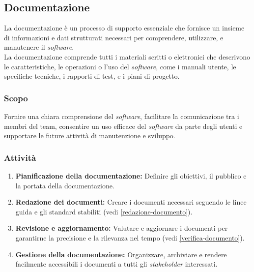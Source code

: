 \subsection{Documentazione}

La documentazione è un processo di supporto essenziale che fornisce un insieme
di informazioni e dati strutturati necessari per comprendere, utilizzare, e
manutenere il \textit{software}.\\
La documentazione comprende tutti i materiali scritti o elettronici che
descrivono le caratteristiche, le operazioni o l'uso del \textit{software},
come i manuali utente, le specifiche tecniche, i rapporti di test, e i piani di
progetto.

\subsubsection{Scopo}
Fornire una chiara comprensione del \textit{software}, facilitare la
comunicazione tra i membri del team, consentire un uso efficace del
\textit{software} da parte degli utenti e supportare le future attività di
manutenzione e sviluppo.

\subsubsection{Attività}
\begin{enumerate}
	\item \textbf{Pianificazione della documentazione:} Definire gli obiettivi,
	      il pubblico e la portata della documentazione.
	\item \textbf{Redazione dei documenti:} Creare i documenti necessari
	      seguendo le linee guida e gli standard stabiliti
	      (vedi \cref{redazione-documento}).
	\item \textbf{Revisione e aggiornamento:} Valutare e aggiornare i documenti
	      per garantirne la precisione e la rilevanza nel tempo (vedi
	      \cref{verifica-documento}).
	\item \textbf{Gestione della documentazione:} Organizzare, archiviare e
	      rendere facilmente accessibili i documenti a tutti gli
	      \textit{stakeholder} interessati.
\end{enumerate}


